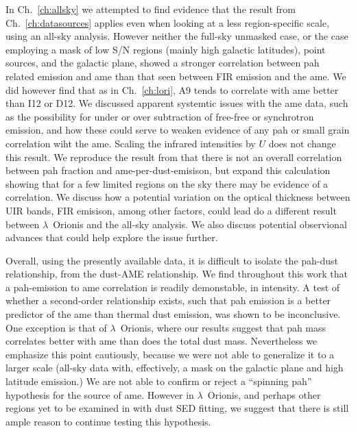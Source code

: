   In Ch.~\ref{ch:allsky} we attempted to find evidence that the result from Ch.~\ref{ch:datasources} applies even when looking at a less region-specific scale, using an all-sky analysis. However neither the full-sky unmasked case, or the case employing a mask of low S/N regions (mainly high galactic latitudes), point sources, and the galactic plane, showed a stronger correlation between \acrshort{pah} related emission and \acrshort{ame} than that seen between FIR emission and the \acrshort{ame}. We did however find that as in Ch.~\ref{ch:lori}, A9 tends to correlate with \acrshort{ame} better than I12 or D12. We discussed apparent systemtic issues with the \acrshort{ame} data, such as the possibility for under or over subtraction of free-free or synchrotron emission, and how these could serve to weaken evidence of any \acrshort{pah} or small grain correlation wiht the \acrshort{ame}. Scaling the infrared intensities by $U$ does not change this result. We reproduce the result from \cite{hensley16} that there is not an overall correlation between \acrshort{pah} fraction and \acrshort{ame}-per-dust-emisison, but expand this calculation showing that for a few limited regions on the sky there may be evidence of a correlation. We discuss how a potential variation on the optical thickness between UIR bands, FIR emisison, among other factors, could lead do a different result between $\lambda$~Orionis and the all-sky analysis. We also discuss potential observional advances that could help explore the issue further.

  Overall, using the presently available data, it is difficult to isolate the \acrshort{pah}-dust relationship, from the dust-AME relationship. We find throughout this work that a \acrshort{pah}-emission to \acrshort{ame} correlation is readily demonstable, in intensity. A test of whether a second-order relationship exists, such that \acrshort{pah} emission is a better predictor of the \acrshort{ame} than thermal dust emission, was shown to be inconclusive. One exception is that of $\lambda$~Orionis, where our results suggest that \acrshort{pah} mass correlates better with \acrshort{ame} than does the total dust mass. Nevertheless we emphasize this point cautiously, because we were not able to generalize it to a larger scale (all-sky data with, effectively, a mask on the galactic plane and high latitude emission.)  We are not able to confirm or reject a ``spinning \acrshort{pah}'' hypothesis for the source of \acrshort{ame}. However in $\lambda$~Orionis, and perhaps other regions yet to be examined in with dust SED fitting, we suggest that there is still ample reason to continue testing this hypothesis.

